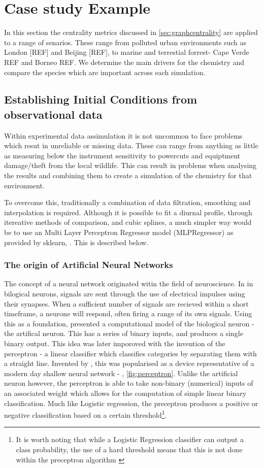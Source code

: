 
\section{Case study Example}\label{sec:metriccase}
In this section the centrality metrics discussed in \autoref{sec:graphcentrality} are applied to a range of senarios. These range from polluted urban environments such as London [REF] and Beijing [REF], to marine and terrestial forrest- Cape Verde REF and Borneo REF. We determine the main drivers for the chemistry and compare the species which are important across each simulation.  

\subsection{Establishing Initial Conditions from observational data}
Within experimental data assimulation it is not uncommon to face problems which resut in unreliable or missing data. These can range from anything as little as measuring below the instrument sensitivity to powercuts and equiptment damage/theft from the local wildlife. This can result in problems when analysing the results and combining them to create a simulation of the chemistry for that environment. 

To overcome this, traditionally a combination of data filtration, smoothing and interpolation is required. Although it is possible to fit a diurnal profile, through itereative methods of comparison, and cubic splines, a much simpler way would be to use an Multi Layer Perceptron Regressor model (MLPRegressor) as provided by sklearn, \citep{sklearn}. This is described below.

\subsubsection{The origin of Artificial Neural Networks}
The concept of a neural network originated witin the field of neuroscience. In in bilogical neurons, signals are sent through the use of electrical impulses using their synapses. When a sufficient number of signals are recieved within a short timeframe, a neurone will respond, often firing a range of its own signals. Using this as a foundation,\cite{pitts} presented a computational model of the biological neuron - the artifical neuron. This has a series of binary inputs, and produces a single binary output. This idea was later imporoved with the invention of the perceptron - a linear classifier which classifies categories by separating them with a straight line. Invented by \cite{perceptron}, this was popularised as a device representative of a modern day shallow neural network - \citep{perceptronmanual}, \autoref{fig:perceptron}. Unlike the artificial neuron however, the perceptron is able to take non-binary (numerical) inputs of an associated weight which allows for the computation of simple linear binary classification. Much like Logistic regression, the preceptron produces a positive or negative classification based on a certain threshold\footnote{It is worth noting that while a Logistic Regression classifier can output a class probability, the use of a hard threshold means that this is not done within the preceptron algorithm \citep{handsonml}}. 


